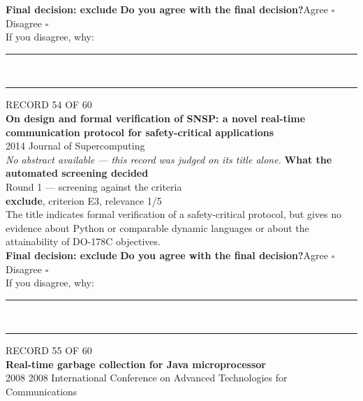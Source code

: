 \documentclass[11pt,a4paper]{article}
\begin{document}
{\small\textbf{Final decision: exclude}}
\vspace{2mm}
{\small\textbf{Do you agree with the final decision?}\quad{}Agree $\square$\qquad{}Disagree $\square$}\\[1mm]
{\footnotesize\color{soft}If you disagree, why:}\\[1mm]
\color{rule}\rule{\linewidth}{0.3pt}\\[3mm]\rule{\linewidth}{0.3pt}\color{black}
\clearpage
{\color{soft}\footnotesize RECORD 54 OF 60}\\[1mm]
{\large\bfseries On design and formal verification of SNSP: a novel real-time communication protocol for safety-critical applications}\\[1.5mm]
{\color{soft}\small 2014 \textperiodcentered{} Journal of Supercomputing}\\[2mm]
{\small\itshape\color{soft}No abstract available --- this record was judged on its title alone.}
\vspace{3mm}
\vspace{2.5mm}
{\small\textbf{What the automated screening decided}}\\[2mm]
{\footnotesize\color{soft}Round 1 --- screening against the criteria}\\[0.5mm]
{\small\textbf{exclude}, criterion E3, relevance 1/5}\\[0.5mm]
{\small The title indicates formal verification of a safety-critical protocol, but gives no evidence about Python or comparable dynamic languages or about the attainability of DO-178C objectives.}\\[2.5mm]
{\small\textbf{Final decision: exclude}}
\vspace{2mm}
{\small\textbf{Do you agree with the final decision?}\quad{}Agree $\square$\qquad{}Disagree $\square$}\\[1mm]
{\footnotesize\color{soft}If you disagree, why:}\\[1mm]
\color{rule}\rule{\linewidth}{0.3pt}\\[3mm]\rule{\linewidth}{0.3pt}\color{black}
\clearpage
{\color{soft}\footnotesize RECORD 55 OF 60}\\[1mm]
{\large\bfseries Real-time garbage collection for Java microprocessor}\\[1.5mm]
{\color{soft}\small 2008 \textperiodcentered{} 2008 International Conference on Advanced Technologies for Communications}\\[2mm]
\end{document}
